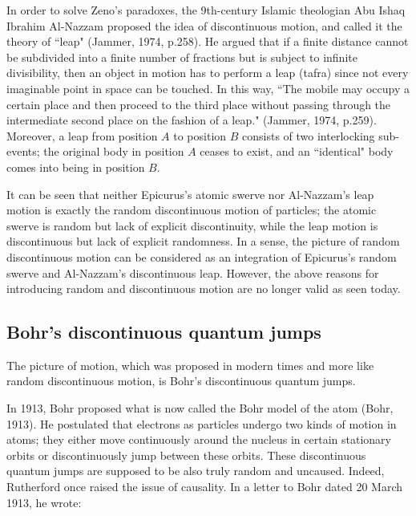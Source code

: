 In order to solve Zeno's paradoxes, the 9th-century Islamic  theologian  Abu Ishaq Ibrahim Al-Nazzam proposed the idea of discontinuous motion, and called it the theory of ``leap" (Jammer, 1974, p.258). He argued that if a finite distance cannot be subdivided into a finite number of fractions but is subject to infinite divisibility, then an object in motion has to perform a leap (tafra) since not every imaginable point in space can be touched. In this way, ``The mobile may occupy a certain place and then proceed to the third place without passing through the intermediate second place on the fashion of a leap." (Jammer, 1974, p.259). Moreover, a leap from position $A$ to position $B$ consists of two interlocking sub-events; the original body in position $A$ ceases to exist, and an ``identical" body comes into being in position $B$. 

It can be seen that neither Epicurus's atomic swerve nor Al-Nazzam's leap motion is exactly the  random discontinuous motion of particles; the  atomic swerve is random but lack of explicit discontinuity, while the leap motion is discontinuous but lack of explicit randomness. In a sense, the picture of random discontinuous motion can be considered as an integration of Epicurus's random swerve and Al-Nazzam's discontinuous leap. However, the above reasons for introducing random and discontinuous motion are no longer valid as seen today. 

\subsection{Bohr's discontinuous quantum jumps}

The picture of motion, which was proposed in modern times and more like random discontinuous motion, is Bohr's discontinuous quantum jumps.

In 1913, Bohr proposed what is now called the Bohr model of the atom (Bohr, 1913). 
He postulated that electrons as particles undergo two kinds of motion in atoms; they either move continuously around the nucleus in certain stationary orbits or discontinuously jump between these orbits. These  discontinuous quantum jumps are supposed to be also truly random and uncaused. 
Indeed, Rutherford once raised the issue of causality. In a letter to Bohr dated 20 March 1913, he wrote:


